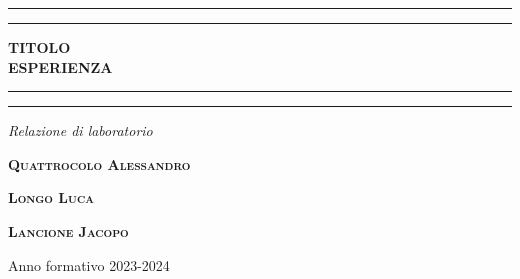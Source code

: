  \begin{titlepage} 
	\centering 
	\scshape 
	
	\vspace*{\baselineskip}
	\rule{\textwidth}{1.6pt}\vspace*{-\baselineskip}\vspace*{2pt} 
	\rule{\textwidth}{0.4pt} 
	
	\vspace{0.75\baselineskip} 
	
	\textbf{\LARGE TITOLO\\ ESPERIENZA\\} 
	
	\vspace{0.75\baselineskip} 
	
	\rule{\textwidth}{0.4pt}\vspace*{-\baselineskip}\vspace{3.2pt} 
	\rule{\textwidth}{1.6pt} 
	
	\vspace{2\baselineskip}
	
	\textit{Relazione di laboratorio} 
	
	\vspace*{3\baselineskip} 


 
	\vspace{0.5\baselineskip} 
	
	\textbf{\scshape\Large Quattrocolo Alessandro }
 
    \vspace{0.3in}
    \textbf{\scshape\Large Longo Luca }
 
    \vspace{0.3in}
    \textbf{\scshape\Large Lancione Jacopo } 
	
	\vspace{4.5\baselineskip} 
	
	\vfill
	
	\vspace{0.3\baselineskip} 
	
	Anno formativo 2023-2024 
	
\end{titlepage}

%